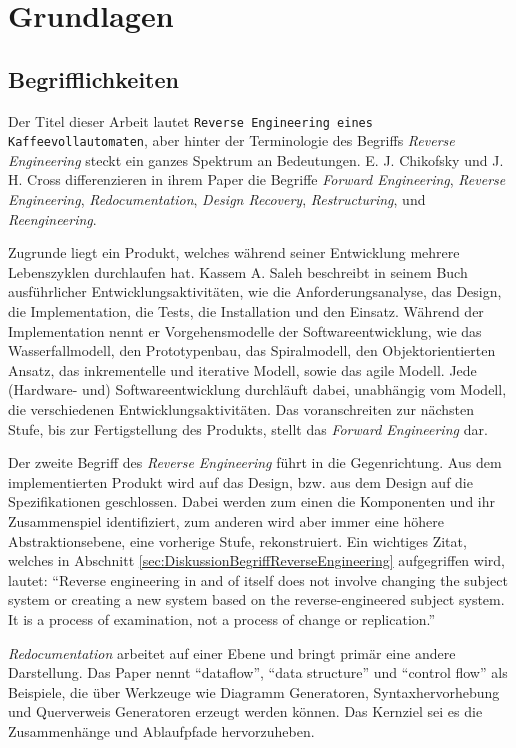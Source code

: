 \chapter{Grundlagen}

\section{Begrifflichkeiten}\label{sec:Begrifflichkeiten}
Der Titel dieser Arbeit lautet \texttt{Reverse Engineering eines Kaffeevollautomaten}, aber hinter der Terminologie des Begriffs \textit{Reverse Engineering} steckt ein ganzes Spektrum an Bedeutungen. E. J. Chikofsky und J. H. Cross differenzieren in ihrem Paper \cite{43044} die Begriffe \textit{Forward Engineering}, \textit{Reverse Engineering}, \textit{Redocumentation}, \textit{Design Recovery}, \textit{Restructuring}, und \textit{Reengineering}.

Zugrunde liegt ein Produkt, welches während seiner Entwicklung mehrere Lebenszyklen durchlaufen hat. Kassem A. Saleh beschreibt in seinem Buch \cite{Solr-599853700} ausführlicher Entwicklungsaktivitäten, wie die Anforderungsanalyse, das Design, die Implementation, die Tests, die Installation und den Einsatz. Während der Implementation nennt er Vorgehensmodelle der Softwareentwicklung, wie das Wasserfallmodell, den Prototypenbau, das Spiralmodell, den Objektorientierten Ansatz, das inkrementelle und iterative Modell, sowie das agile Modell. Jede (Hardware- und) Softwareentwicklung durchläuft dabei, unabhängig vom Modell, die verschiedenen Entwicklungsaktivitäten. Das voranschreiten zur nächsten Stufe, bis zur Fertigstellung des Produkts, stellt das \textit{Forward Engineering} dar.

Der zweite Begriff des \textit{Reverse Engineering} führt in die Gegenrichtung. Aus dem implementierten Produkt wird auf das Design, bzw. aus dem Design auf die Spezifikationen geschlossen. Dabei werden zum einen die Komponenten und ihr Zusammenspiel identifiziert, zum anderen wird aber immer eine höhere Abstraktionsebene, eine vorherige Stufe, rekonstruiert. Ein wichtiges Zitat, welches in Abschnitt \ref{sec:DiskussionBegriffReverseEngineering}  aufgegriffen wird, lautet: "`Reverse engineering in and of itself does not involve changing the subject system or creating a new system based on the reverse-engineered subject system. It is a process of examination, not a process of change or replication."'\cite{43044}

\textit{Redocumentation} arbeitet auf einer Ebene und bringt primär eine andere Darstellung. Das Paper nennt "`dataflow"', "`data structure"' und "`control flow"' als Beispiele, die über Werkzeuge wie Diagramm Generatoren, Syntaxhervorhebung und Querverweis Generatoren erzeugt werden können. Das Kernziel sei es die Zusammenhänge und Ablaufpfade hervorzuheben.

